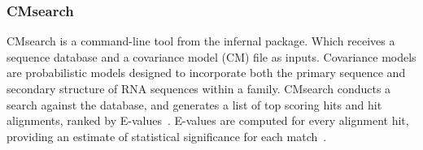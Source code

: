 \subsubsection{CMsearch}\label{subsubsec:CMsearch}
CMsearch is a command-line tool from the infernal package. Which receives a sequence database and a covariance model (CM) file as inputs. Covariance models are probabilistic models designed to incorporate both the primary sequence and secondary structure of RNA sequences within a family. CMsearch conducts a search against the database, and generates a list of top scoring hits and hit alignments, ranked by E-values~\cite{nawrocki_infernal_2013}. E-values are computed for every alignment hit, providing an estimate of statistical significance for each match~\cite{kalvari_non-coding_2018}.